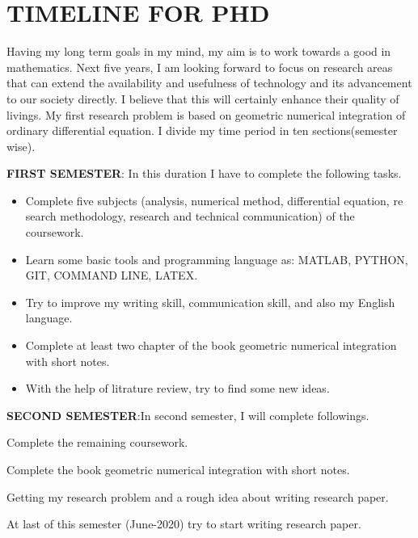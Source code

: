 \documentclass[PhD]{iitmdiss}
\begin{document}
\appendix
\chapter{TIMELINE FOR PHD}

Having my long term goals in my mind, my aim is to work towards a good in
mathematics. Next five years, I am looking forward to focus on research areas that
can extend the availability and usefulness of technology and its advancement to our
society directly. I believe that this will certainly enhance their quality of livings.
My first research problem is based on geometric numerical integration of ordinary
differential equation.
I divide my time period in ten sections(semester wise).

    {\textbf{FIRST SEMESTER}:{ In this duration I have to complete the following tasks.}\\
    \begin{itemize}
 
    
    \item{Complete five subjects (analysis, numerical method, differential equation, re
search methodology, research and technical communication) of the coursework.}\\
\item{Learn some basic tools and programming language as: MATLAB, PYTHON,
GIT, COMMAND LINE, LATEX.}\\
\item{Try to improve my writing skill, communication skill, and also my English
language.}\\
\item{Complete at least two chapter of the book geometric numerical integration with
short notes.}\\
\item{With the help of litrature review, try to find some new ideas.}\\
\end{itemize}
{\textbf{SECOND SEMESTER}:{In second semester, I will complete followings.}\\
\begin{itemize}
    

    \item{Complete the remaining coursework.\\
 \item{ Complete the book geometric numerical integration with short notes.}\\
 \item{Getting my research problem and a rough idea about writing research paper.}\\
 \item{At last of this semester (June-2020) try to start writing research paper.}\\
 
}
\end{itemize}}}
\end{document}
